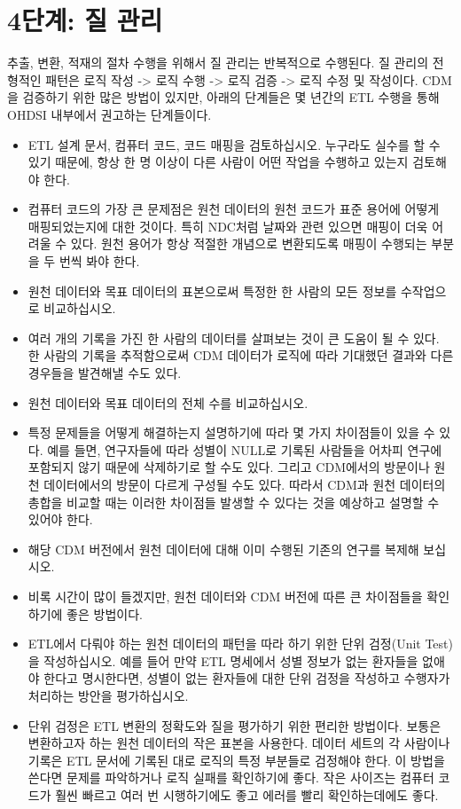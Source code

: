 \documentclass[11pt]{book}
\providecommand{\tightlist}{%
  \setlength{\itemsep}{0pt}\setlength{\parskip}{0pt}}
\theoremstyle{definition}
\theoremstyle{definition}
\theoremstyle{definition}
\theoremstyle{remark}
\begin{document}
\section{4단계: 질 관리}\label{--}

추출, 변환, 적재의 절차 수행을 위해서 질 관리는 반복적으로 수행된다. 질
관리의 전형적인 패턴은 로직 작성 -\textgreater{} 로직 수행
-\textgreater{} 로직 검증 -\textgreater{} 로직 수정 및 작성이다. CDM을
검증하기 위한 많은 방법이 있지만, 아래의 단계들은 몇 년간의 ETL 수행을
통해 OHDSI 내부에서 권고하는 단계들이다. 

\begin{itemize}
\tightlist
\item
  ETL 설계 문서, 컴퓨터 코드, 코드 매핑을 검토하십시오. 누구라도 실수를
  할 수 있기 때문에, 항상 한 명 이상이 다른 사람이 어떤 작업을 수행하고
  있는지 검토해야 한다.
\item
  컴퓨터 코드의 가장 큰 문제점은 원천 데이터의 원천 코드가 표준 용어에
  어떻게 매핑되었는지에 대한 것이다. 특히 NDC처럼 날짜와 관련 있으면
  매핑이 더욱 어려울 수 있다. 원천 용어가 항상 적절한 개념으로
  변환되도록 매핑이 수행되는 부분을 두 번씩 봐야 한다.
\item
  원천 데이터와 목표 데이터의 표본으로써 특정한 한 사람의 모든 정보를
  수작업으로 비교하십시오.
\item
  여러 개의 기록을 가진 한 사람의 데이터를 살펴보는 것이 큰 도움이 될 수
  있다. 한 사람의 기록을 추적함으로써 CDM 데이터가 로직에 따라 기대했던
  결과와 다른 경우들을 발견해낼 수도 있다.
\item
  원천 데이터와 목표 데이터의 전체 수를 비교하십시오.
\item
  특정 문제들을 어떻게 해결하는지 설명하기에 따라 몇 가지 차이점들이
  있을 수 있다. 예를 들면, 연구자들에 따라 성별이 NULL로 기록된 사람들을
  어차피 연구에 포함되지 않기 때문에 삭제하기로 할 수도 있다. 그리고
  CDM에서의 방문이나 원천 데이터에서의 방문이 다르게 구성될 수도 있다.
  따라서 CDM과 원천 데이터의 총합을 비교할 때는 이러한 차이점들 발생할
  수 있다는 것을 예상하고 설명할 수 있어야 한다.
\item
  해당 CDM 버전에서 원천 데이터에 대해 이미 수행된 기존의 연구를 복제해
  보십시오.
\item
  비록 시간이 많이 들겠지만, 원천 데이터와 CDM 버전에 따른 큰 차이점들을
  확인하기에 좋은 방법이다.
\item
  ETL에서 다뤄야 하는 원천 데이터의 패턴을 따라 하기 위한 단위 검정(Unit
  Test)을 작성하십시오. 예를 들어 만약 ETL 명세에서 성별 정보가 없는
  환자들을 없애야 한다고 명시한다면, 성별이 없는 환자들에 대한 단위
  검정을 작성하고 수행자가 처리하는 방안을 평가하십시오.
\item
  단위 검정은 ETL 변환의 정확도와 질을 평가하기 위한 편리한 방법이다.
  보통은 변환하고자 하는 원천 데이터의 작은 표본을 사용한다. 데이터
  세트의 각 사람이나 기록은 ETL 문서에 기록된 대로 로직의 특정 부분들로
  검정해야 한다. 이 방법을 쓴다면 문제를 파악하거나 로직 실패를
  확인하기에 좋다. 작은 사이즈는 컴퓨터 코드가 훨씬 빠르고 여러 번
  시행하기에도 좋고 에러를 빨리 확인하는데에도 좋다.
\end{itemize}
\end{document}
